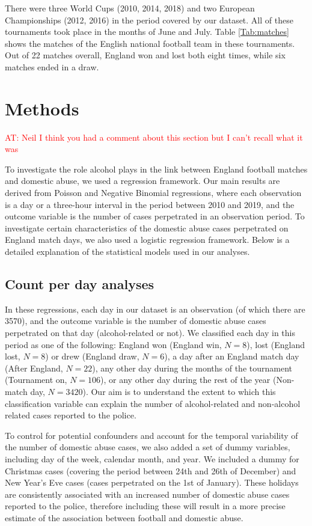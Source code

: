 \documentclass[12pt, a4paper]{article}
\newcommand{\AT}[1]{\textcolor{red}{AT: #1}}
\begin{document}
 There were three World Cups (2010, 2014, 2018) and two European Championships (2012, 2016) in the period covered by our dataset. All of these tournaments took place in the months of June and July. 
Table \ref{Tab:matches} shows the matches of the English national football team in these tournaments. Out of 22 matches overall, England won and lost both eight times, while six matches ended in a draw. 

\section{Methods}

\AT{Neil I think you had a comment about this section but I can't recall what it was}

To investigate the role alcohol plays in the link between England football matches and domestic abuse, we used a regression framework. Our main results are derived from Poisson and Negative Binomial regressions, where each observation is a day or a three-hour interval in the period between 2010 and 2019, and the outcome variable is the number of cases perpetrated in an observation period. To investigate certain characteristics of the domestic abuse cases perpetrated on England match days, we also used a logistic regression framework. Below is a detailed explanation of the statistical models used in our analyses.  


\subsection{Count per day analyses} 
\label{modelsexplained}


In these regressions, each day in our dataset is an observation (of which there are 3570), and the outcome variable is the number of domestic abuse cases perpetrated on that day (alcohol-related or not). We classified each day in this period as one of the following: England won (England win, $N = 8$), lost (England lost, $N = 8$) or drew (England draw, $N = 6$), a day after an England match day (After England, $N = 22$), any other day during the months of the tournament (Tournament on, $N = 106$), or any other day during the rest of the year (Non-match day, $N = 3420$). Our aim is to understand the extent to which this classification variable can explain the number of alcohol-related and non-alcohol related cases reported to the police.

To control for potential confounders and account for the temporal variability of the number of domestic abuse cases, we also added a set of dummy  variables, including day of the week, calendar month, and year. 
We included a dummy for Christmas cases (covering the period between 24th and 26th of December) and New Year's Eve cases (cases perpetrated on the 1st of January). 
These holidays are consistently associated with an increased number of domestic abuse cases reported to the police, therefore including these will result in a more precise estimate of the association between football and domestic abuse.
\end{document}
